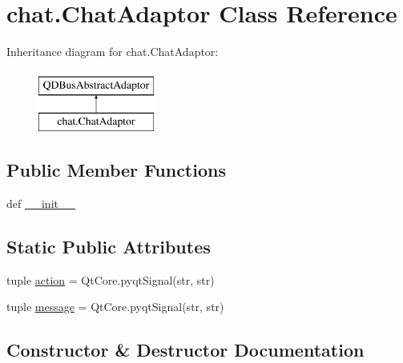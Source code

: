 \hypertarget{classchat_1_1ChatAdaptor}{}\section{chat.\+Chat\+Adaptor Class Reference}
\label{classchat_1_1ChatAdaptor}
Inheritance diagram for chat.\+Chat\+Adaptor\+:\begin{figure}[H]
\begin{center}
\leavevmode
\includegraphics[height=2.000000cm]{classchat_1_1ChatAdaptor}
\end{center}
\end{figure}
\subsection*{Public Member Functions}
\begin{DoxyCompactItemize}
\item 
def \hyperlink{classchat_1_1ChatAdaptor_a8a39785e8680a21f05d56fd634622938}{\+\_\+\+\_\+init\+\_\+\+\_\+}
\end{DoxyCompactItemize}
\subsection*{Static Public Attributes}
\begin{DoxyCompactItemize}
\item 
tuple \hyperlink{classchat_1_1ChatAdaptor_ace9d423be54266ae7ab71209c78a60e6}{action} = Qt\+Core.\+pyqt\+Signal(str, str)
\item 
tuple \hyperlink{classchat_1_1ChatAdaptor_acc9aa4d3bdf76d9e7fbc99cfcf9e14d2}{message} = Qt\+Core.\+pyqt\+Signal(str, str)
\end{DoxyCompactItemize}


\subsection{Constructor \& Destructor Documentation}
\hypertarget{classchat_1_1ChatAdaptor_a8a39785e8680a21f05d56fd634622938}{}
